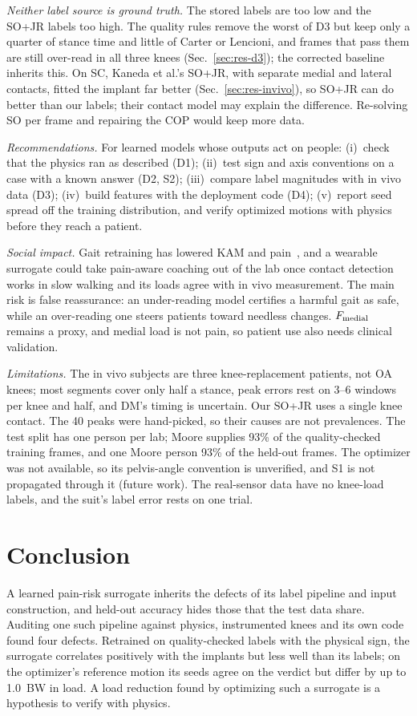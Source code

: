 \textit{Neither label source is ground truth.} The stored labels are too low and the SO+JR
labels too high. The quality rules remove the worst of D3 but keep only a quarter of stance time
and little of Carter or Lencioni, and frames that pass them are still over-read in all three knees
(Sec.~\ref{sec:res-d3}); the corrected baseline inherits this. On SC, Kaneda et al.'s SO+JR, with
separate medial and lateral contacts, fitted the implant far better (Sec.~\ref{sec:res-invivo}),
so SO+JR can do better than our labels; their contact model may explain the difference.
Re-solving SO per frame and repairing the COP would keep more data.

\textit{Recommendations.} For learned models whose outputs act on people: (i)~check that the physics ran
as described (D1); (ii)~test sign and axis conventions on a case with a known answer (D2, S2);
(iii)~compare label magnitudes with in vivo data (D3); (iv)~build features with the deployment
code (D4); (v)~report seed spread off the training distribution, and verify optimized motions
with physics before they reach a patient.

\textit{Social impact.} Gait retraining has lowered KAM and pain~\cite{shull2013six}, and a
wearable surrogate could take pain-aware coaching out of the lab once contact detection works in
slow walking and its loads agree with in vivo measurement. The main risk is false reassurance: an under-reading model certifies a harmful gait as
safe, while an over-reading one steers patients toward needless changes. $F_{\mathrm{medial}}$ remains a proxy, and medial load is not pain, so patient use
also needs clinical validation.

\textit{Limitations.} The in vivo subjects are three knee-replacement patients, not OA knees; most
segments cover only half a stance, peak errors rest on 3--6 windows per knee and half, and DM's
timing is uncertain. Our SO+JR uses a single knee contact. The 40 peaks were hand-picked, so their
causes are not prevalences. The test split has one person per lab; Moore supplies 93\% of the
quality-checked training frames, and one Moore person 93\% of the held-out frames. The optimizer
was not available, so its pelvis-angle convention is unverified, and S1 is not propagated through
it (future work). The real-sensor data have no knee-load labels, and the suit's label error rests
on one trial.

\section{Conclusion}\label{sec:conclusion}
A learned pain-risk surrogate inherits the defects of its label pipeline and input construction,
and held-out accuracy hides those that the test data share. Auditing one such pipeline against
physics, instrumented knees and its own code found four defects. Retrained on quality-checked
labels with the physical sign, the surrogate correlates positively with the implants but less well
than its labels; on the optimizer's reference motion its seeds agree on the verdict but differ by
up to 1.0~BW in load. A load reduction found by optimizing such a
surrogate is a hypothesis to verify with physics.
